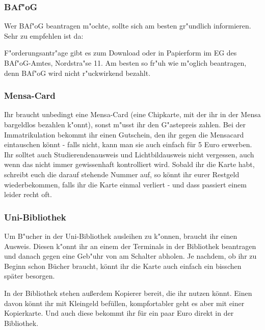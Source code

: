 \begin{multicols}{2}

\subsubsection{BAf"oG}
\label{todobafoeg}

Wer BAf"oG beantragen m"ochte, sollte sich am besten gr"undlich
informieren. Sehr zu empfehlen ist da: \\
\mbox{}
 
F"orderungsantr"age gibt es zum Download oder in Papierform im
EG des BAf"oG-Amtes, Nordstra"se 11. Am besten so fr"uh
wie m"oglich beantragen, denn BAf"oG wird nicht r"uckwirkend
bezahlt.

\subsubsection{Mensa-Card}
\label{todomensa}

Ihr braucht unbedingt eine Mensa-Card (eine Chipkarte,
mit der ihr in der Mensa bargeldlos bezahlen k"onnt), sonst
m"usst ihr den G"astepreis zahlen. Bei der Immatrikulation bekommt ihr 
einen Gutschein, den ihr gegen die Mensacard eintauschen könnt - falls 
nicht, kann man sie auch einfach für 5 Euro erwerben. Ihr solltet auch 
Studierendenausweis und Lichtbildausweis nicht vergessen, auch wenn 
das nicht immer gewissenhaft kontrolliert wird. Sobald ihr die Karte 
habt, schreibt euch die darauf stehende Nummer auf, so könnt ihr eurer 
Restgeld wiederbekommen, falls ihr die Karte einmal verliert - und dass 
passiert einem leider recht oft.

\subsubsection{Uni-Bibliothek}
\label{todobib}

Um B"ucher in der Uni-Bibliothek ausleihen zu k"onnen, braucht ihr
einen Ausweis. Diesen k"onnt ihr an einem der Terminals in der
Bibliothek beantragen und danach gegen eine Geb"uhr von 
am Schalter abholen. Je nachdem, ob ihr zu Beginn schon Bücher braucht, 
könnt ihr die Karte auch einfach ein bisschen später besorgen.

In der Bibliothek stehen außerdem Kopierer bereit, die ihr nutzen könnt. 
Einen davon könnt ihr mit Kleingeld befüllen, kompfortabler geht es aber 
mit einer Kopierkarte. Und auch diese bekommt ihr für ein paar Euro 
direkt in der Bibliothek.


\end{multicols}
